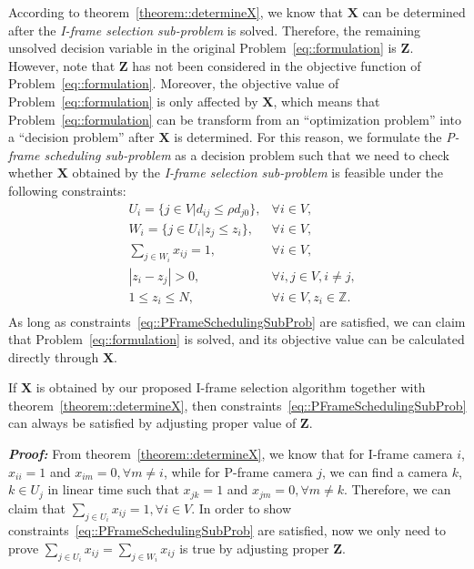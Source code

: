 According to theorem~\ref{theorem::determineX}, we know that $\mathbf{X}$ can be determined after the \emph{I-frame selection sub-problem} is solved.
Therefore, the remaining unsolved decision variable in the original Problem~\eqref{eq::formulation} is $\mathbf{Z}$.
However, note that $\mathbf{Z}$ has not been considered in the objective function of Problem~\eqref{eq::formulation}.
Moreover, the objective value of Problem~\eqref{eq::formulation} is only affected by $\mathbf{X}$, which means that Problem~\eqref{eq::formulation} can be transform from an ``optimization problem'' into a ``decision problem'' after $\mathbf{X}$ is determined.
For this reason, we formulate the \emph{P-frame scheduling sub-problem} as a decision problem such that we need to check whether $\mathbf{X}$ obtained by the \emph{I-frame selection sub-problem} is feasible under the following constraints:
\begin{align}
	&U_i = \{ j \in V | d_{ij} \leq \rho d_{j0} \}, &\forall i \in V, \nonumber \\
	&W_i = \{ j \in U_i | z_j \leq z_i \}, &\forall i \in V, \nonumber \\
	&\sum_{j \in W_i} x_{ij} = 1, &\forall i \in V, \nonumber \\
	&|z_i - z_j| > 0, &\forall i,j \in V, i \neq j, \nonumber \\
	&1 \leq z_i \leq N, &\forall i \in V, z_i \in \mathbb{Z}. \nonumber \\
\label{eq::PFrameSchedulingSubProb}
\end{align}
As long as constraints~\eqref{eq::PFrameSchedulingSubProb} are satisfied, we can claim that Problem~\eqref{eq::formulation} is solved, and its objective value can be calculated directly through $\mathbf{X}$.
%
\begin{mythm}
If $\mathbf{X}$ is obtained by our proposed I-frame selection algorithm together with theorem~\ref{theorem::determineX}, then constraints~\eqref{eq::PFrameSchedulingSubProb} can always be satisfied by adjusting proper value of $\mathbf{Z}$.
\label{theorem::IFrameSolalwaysFeasible}
\end{mythm}
\textbf{\emph{Proof:}}
From theorem~\ref{theorem::determineX}, we know that for I-frame camera $i$, $x_{ii}=1$ and ${x_{im} = 0}, {\forall m \neq i}$, while for P-frame camera $j$, we can find a camera $k$, ${k \in U_j}$ in linear time such that ${x_{jk} = 1}$ and ${x_{jm}=0}, \forall m \neq k$.
Therefore, we can claim that ${\underset{j \in U_i}{\sum} x_{ij}=1},{\forall i \in V}$.
In order to show constraints~\eqref{eq::PFrameSchedulingSubProb} are satisfied, now we only need to prove ${\underset{j \in U_i}{\sum} x_{ij} = \underset{j \in W_i}{\sum} x_{ij}}$ is true by adjusting proper $\mathbf{Z}$.
